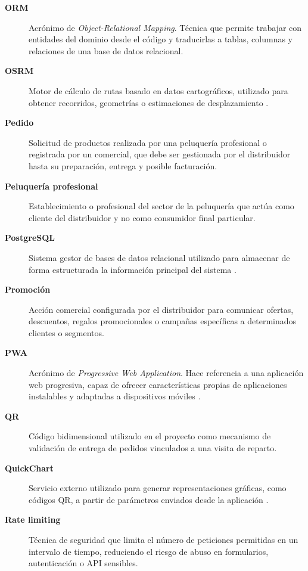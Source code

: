 \begin{description}
\item[\textbf{ORM}]
Acrónimo de \textit{Object-Relational Mapping}. Técnica que permite trabajar con entidades del dominio desde el código y traducirlas a tablas, columnas y relaciones de una base de datos relacional.

\item[\textbf{OSRM}]
Motor de cálculo de rutas basado en datos cartográficos, utilizado para obtener recorridos, geometrías o estimaciones de desplazamiento \citep{osrmdocs2026}.

\item[\textbf{Pedido}]
Solicitud de productos realizada por una peluquería profesional o registrada por un comercial, que debe ser gestionada por el distribuidor hasta su preparación, entrega y posible facturación.

\item[\textbf{Peluquería profesional}]
Establecimiento o profesional del sector de la peluquería que actúa como cliente del distribuidor y no como consumidor final particular.

\item[\textbf{PostgreSQL}]
Sistema gestor de bases de datos relacional utilizado para almacenar de forma estructurada la información principal del sistema \citep{postgresdocs2026}.

\item[\textbf{Promoción}]
Acción comercial configurada por el distribuidor para comunicar ofertas, descuentos, regalos promocionales o campañas específicas a determinados clientes o segmentos.

\item[\textbf{PWA}]
Acrónimo de \textit{Progressive Web Application}. Hace referencia a una aplicación web progresiva, capaz de ofrecer características propias de aplicaciones instalables y adaptadas a dispositivos móviles \citep{webdev-pwa}.

\item[\textbf{QR}]
Código bidimensional utilizado en el proyecto como mecanismo de validación de entrega de pedidos vinculados a una visita de reparto.

\item[\textbf{QuickChart}]
Servicio externo utilizado para generar representaciones gráficas, como códigos QR, a partir de parámetros enviados desde la aplicación \citep{quickchartqr2026}.

\item[\textbf{Rate limiting}]
Técnica de seguridad que limita el número de peticiones permitidas en un intervalo de tiempo, reduciendo el riesgo de abuso en formularios, autenticación o API sensibles.


\end{description}
